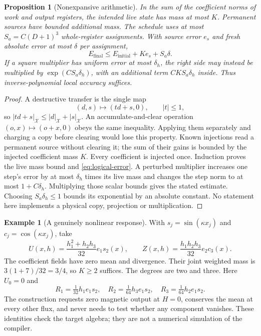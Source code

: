 \documentclass[11pt,a4paper]{amsart}
\newtheorem{proposition}[theorem]{Proposition}
\theoremstyle{definition}
\newtheorem{example}[theorem]{Example}
\theoremstyle{remark}
\numberwithin{equation}{section}
\begin{document}
\begin{proposition}[Nonexpansive arithmetic]\label{prop:logical-arithmetic}
In the sum of the coefficient norms of work and output registers, the
intended live state has mass at most $K$. Permanent sources have bounded
additional mass. The schedule uses at most $S_a=C(D+1)^3$ whole-register
assignments. With source error $e_s$ and fresh absolute error at most
$\delta$ per assignment,
\begin{equation}\label{eq:logical-error}
 E_{\mathrm{final}}\le E_{\mathrm{initial}}+K e_s+S_a\delta.
\end{equation}
If a square multiplier has uniform error at most $\delta_h$, the right
side may instead be multiplied by $\exp(CS_a\delta_h)$, with an additional
term $CKS_a\delta_h$ inside. Thus inverse-polynomial local accuracy suffices.
\end{proposition}
\begin{proof}
A destructive transfer is the single map
\[
 (d,s)\longmapsto(td+s,0),\qquad |t|\le1,
\]
so $|td+s|_{\mathcal X}\le|d|_{\mathcal X}+|s|_{\mathcal X}$.
An accumulate-and-clear operation $(o,x)\mapsto(o+x,0)$ obeys the same
inequality. Applying them separately and charging a copy before clearing
would lose this property. Known injections read a permanent source without
clearing it; the sum of their gains is bounded by the injected coefficient
mass $K$. Every coefficient is injected once. Induction proves the live
mass bound and \eqref{eq:logical-error}. A perturbed multiplier increases
one step's error by at most $\delta_h$ times its live mass and changes the
step norm to at most $1+C\delta_h$. Multiplying those scalar bounds gives
the stated estimate. Choosing $S_a\delta_h\le1$ bounds its exponential
by an absolute constant. No statement here implements a physical copy,
projection or multiplication.
\end{proof}

\begin{example}[A genuinely nonlinear response]\label{ex:nonlinear}
With $s_j=\sin(\kappa x_j)$ and $c_j=\cos(\kappa x_j)$, take
\[
 U(x,h)=\frac{h_1^2+h_2h_3}{32}e_1s_2(x),\qquad
 Z(x,h)=\frac{h_1h_2h_3}{32}e_2c_3(x).
\]
The coefficient fields have zero mean and divergence. Their joint weighted
mass is $3(1+7)/32=3/4$, so $K\ge2$ suffices. The degrees are two and
three. Here $U_0=0$ and
\[
 R_1=\tfrac1{32}h_1e_1s_2,\quad
 R_2=\tfrac1{64}h_3e_1s_2,\quad
 R_3=\tfrac1{64}h_2e_1s_2.
\]
The construction requests zero magnetic output at $H=0$, conserves the
mean at every other flux, and never needs to test whether any component
vanishes. These identities check the target algebra; they are not a
numerical simulation of the compiler.
\end{example}
\end{document}
